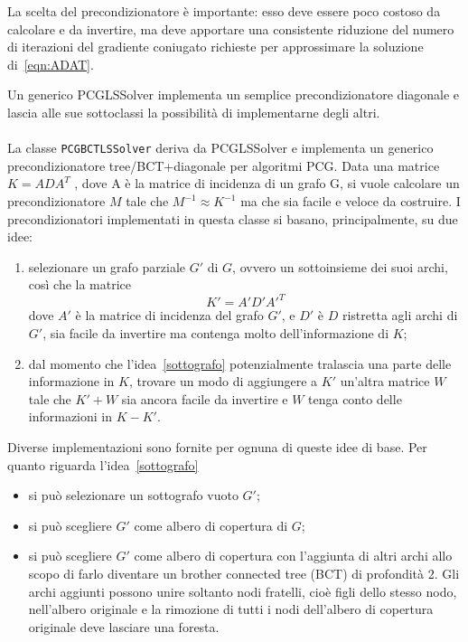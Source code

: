La scelta del precondizionatore è importante: esso deve essere poco costoso da calcolare e da invertire, ma deve apportare una consistente riduzione del numero di iterazioni del gradiente coniugato richieste per approssimare la soluzione di~\eqref{eqn:ADAT}.

Un generico PCGLSSolver implementa un semplice precondizionatore diagonale e lascia alle sue sottoclassi la possibilità di implementarne degli altri.\\
\\
La classe \texttt{PCGBCTLSSolver} deriva da PCGLSSolver e implementa un generico precondizionatore tree/BCT+diagonale per algoritmi PCG.
Data una matrice $K = ADA^T$ , dove A è la matrice di incidenza di un grafo G, si vuole calcolare un precondizionatore $M$ tale che $M^{-1} \approx K^{-1}$ ma che sia facile e veloce da costruire. I precondizionatori implementati in questa classe si basano, principalmente, su due idee:
\begin{enumerate}
\item \label{sottografo} selezionare un grafo parziale $G'$ di $G$, ovvero un sottoinsieme dei suoi archi, così che la matrice
\begin{equation*}
K' = A'D'A'^T
\end{equation*}
dove $A'$ è la matrice di incidenza del grafo $G'$, e $D'$ è $D$ ristretta agli archi di $G'$, sia facile da invertire ma contenga molto dell'informazione di $K$;

\item \label{cappa} dal momento che l'idea~\eqref{sottografo} potenzialmente tralascia una parte delle informazione in $K$, trovare un modo di aggiungere a $K'$ un'altra matrice $W$ tale che $K' + W$ sia ancora facile da invertire e $W$ tenga conto delle informazioni in $K- K'$.
\end{enumerate}

Diverse implementazioni sono fornite per ognuna di queste idee di base.
Per quanto riguarda l'idea~\eqref{sottografo}
\begin{itemize}
\item si può selezionare un sottografo vuoto $G'$;
\item si può scegliere $G'$ come albero di copertura di $G$;
\item si può scegliere $G'$ come albero di copertura con l'aggiunta di altri archi allo scopo di farlo diventare un brother connected tree (BCT) di profondità 2. Gli archi aggiunti possono unire soltanto nodi fratelli, cioè figli dello stesso nodo, nell'albero originale e la rimozione di tutti i nodi  dell'albero di copertura originale deve lasciare una foresta.
\end{itemize}

